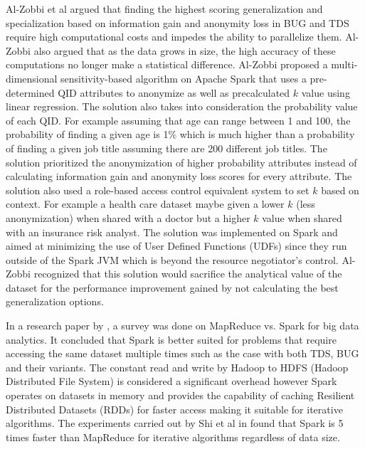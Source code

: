 \documentclass[11pt]{article}       %
\begin{document}
Al-Zobbi et al \cite{Al-Zobbi-Mohammed:2018} argued that finding the highest scoring generalization and specialization based on information gain and anonymity loss in BUG and TDS require high computational costs and impedes the ability to parallelize them. Al-Zobbi also argued that as the data grows in size, the high accuracy of these computations no longer make a statistical difference. Al-Zobbi proposed a multi-dimensional sensitivity-based algorithm on Apache Spark that uses a pre-determined QID attributes to anonymize as well as precalculated $k$ value using linear regression. The solution also takes into consideration the probability value of each QID. For example assuming that age can range between 1 and 100, the probability of finding a given age is 1\% which is much higher than a probability of finding a given job title assuming there are 200 different job titles. The solution prioritized the anonymization of higher probability attributes instead of calculating information gain and anonymity loss scores for every attribute. The solution also used a role-based access control equivalent system to set $k$ based on context. For example a health care dataset maybe given a lower $k$ (less anonymization) when shared with a doctor but a higher $k$ value when shared with an insurance risk analyst. The solution was implemented on Spark and aimed at minimizing the use of User Defined Functions (UDFs) since they run outside of the Spark JVM which is beyond the resource negotiator's control. Al-Zobbi recognized that this solution would sacrifice the analytical value of the dataset for the performance improvement gained by not calculating the best generalization options.

In a research paper by \cite{Shi:2015}, a survey was done on MapReduce vs. Spark for big data analytics. It concluded that Spark is better suited for problems that require accessing the same dataset multiple times such as the case with both TDS, BUG and their variants. The constant read and write by Hadoop to HDFS (Hadoop Distributed File System) is considered a significant overhead however Spark operates on datasets in memory and provides the capability of caching Resilient Distributed Datasets (RDDs) for faster access making it suitable for iterative algorithms. The experiments carried out by Shi et al in \cite{Shi:2015} found that Spark is 5 times faster than MapReduce for iterative algorithms regardless of data size.
\end{document}
